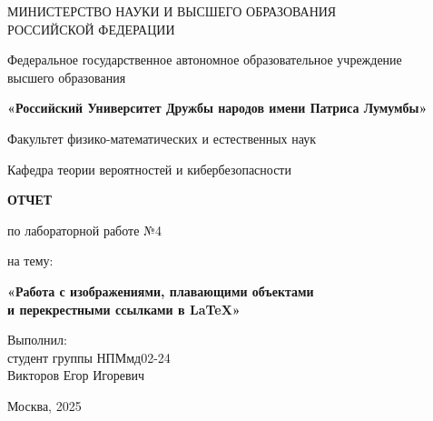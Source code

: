 \documentclass[12pt,a4paper]{article}
\begin{document}
\begin{titlepage}
    \centering
    
    \vspace*{1cm}
    
    {\large МИНИСТЕРСТВО НАУКИ И ВЫСШЕГО ОБРАЗОВАНИЯ\\
    РОССИЙСКОЙ ФЕДЕРАЦИИ}
    
    \vspace{0.5cm}
    
    {\large Федеральное государственное автономное образовательное учреждение\\
    высшего образования}
    
    \vspace{0.3cm}
    
    {\large\bfseries «Российский Университет Дружбы народов имени Патриса Лумумбы»}
    
    \vspace{0.5cm}
    
    {\large Факультет физико-математических и естественных наук}
    
    {\large Кафедра теории вероятностей и кибербезопасности}
    
    \vspace{3cm}
    
    {\Large\bfseries ОТЧЕТ}
    
    \vspace{0.3cm}
    
    {\large по лабораторной работе №4}
    
    \vspace{0.5cm}
    
    {\large на тему:}
    
    \vspace{0.3cm}
    
    {\large\bfseries «Работа с изображениями, плавающими объектами\\и перекрестными ссылками в LaTeX»}
    
    \vfill
    
    \begin{flushright}
        Выполнил:\\
        студент группы НПМмд02-24\\
        Викторов Егор Игоревич\\
        \vspace{0.5cm}
    \end{flushright}
    
    \vfill
    
    {\large Москва, 2025}
    
\end{titlepage}
\end{document}
